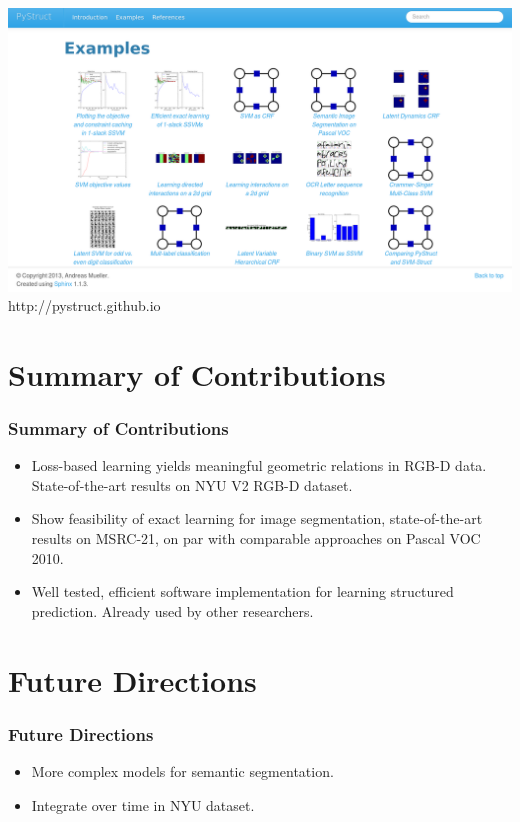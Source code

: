 \documentclass[final,ignorenonframetext,compress]{beamer}
\begin{document}
\begin{frame}
    \begin{center}
        \includegraphics[width=\linewidth]{images/example_gallery}\\
        http://pystruct.github.io
    \end{center}
\end{frame}


\section*{Summary of Contributions}
\begin{frame}
    \frametitle{Summary of Contributions}
    \begin{itemize}
        \item<1-> Loss-based learning yields meaningful geometric relations in RGB-D data. State-of-the-art results on NYU V2 RGB-D dataset.
        \item<2-> Show feasibility of exact learning for image segmentation, state-of-the-art results on MSRC-21, on par with comparable approaches on Pascal VOC 2010.
        \item<3-> Well tested, efficient software implementation for learning structured prediction. Already used by other researchers.
    \end{itemize}
\end{frame}

\section*{Future Directions}
\begin{frame}
    \frametitle{Future Directions}
    \begin{itemize}
        \item More complex models for semantic segmentation.
        \item Integrate over time in NYU dataset.
    \end{itemize}
\end{frame}
\end{document}
